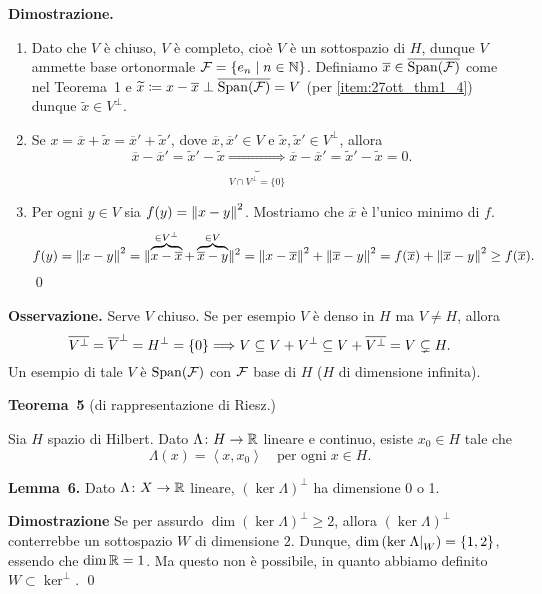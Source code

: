 \textbf{Dimostrazione.}
\begin{enumerate}

\item Dato che $V$ è chiuso, $V$ è completo, cioè $V$ è un sottospazio di $H$, dunque $V$ ammette base ortonormale $\mathcal{F} = \left\{ e_n \;\middle|\; n \in \mathbb N \right\}$.
Definiamo $\overline{x} \in \overline{\operatorname{Span}(\mathcal{F})}$ come nel Teorema~1 e $\widetilde{x} \coloneqq x - \overline{x} \perp \overline{\operatorname{Span}(\mathcal{F})} = V$ (per \ref{item:27ott_thm1_4}) dunque $\tilde{x} \in V^\perp$.

\item Se $x = \overline{x} + \tilde{x} = \overline{x}' + \tilde{x}'$, dove $\overline{x}, \overline{x}' \in V$ e $\tilde{x}, \tilde{x}' \in V^\perp$, allora
%
$$
	\overline{x} - \overline{x}' = \tilde{x}' - \tilde{x} \underbrace{\Longrightarrow}_{V \cap V^\perp = \{0 \} }
	\overline{x} - \overline{x}' = \tilde{x}' - \tilde{x} = 0.
$$
%

\item Per ogni $y \in V$ sia $f(y) = \left\lVert x - y \right\rVert^2$. Mostriamo che $\overline{x}$ è l'unico minimo di $f$.
%
$$
f(y) = \left\lVert x - y \right\rVert^2 = \lVert{\overbrace{x - \overline{x}}^{\in V^\perp} + \overbrace{\overline{x} - y}^{\in V}}\rVert^2 = \left\lVert x - \overline{x} \right\rVert^2 + \left\lVert \overline{x} - y \right\rVert^2
= f(\overline{x}) + \left\lVert \overline{x} - y \right\rVert^2 \geq f(\overline{x}).
$$
%
\qed
\end{enumerate}

\vs

\textbf{Osservazione.}
Serve $V$ chiuso. Se per esempio $V$ è denso in $H$ ma $V \neq H$, allora
%
$$
\overline{V^\perp} = \overline{V}^\perp = H^\perp = \{0\} \Longrightarrow V \subseteq V + V^\perp \subseteq V + \overline{V^\perp} = V \subsetneq H.
$$
%
Un esempio di tale $V$ è $\operatorname{Span}(\mathcal{F})$ con $\mathcal{F}$ base di $H$ ($H$ di dimensione infinita).

\newpage

\hypertarget{thm:lez2728ott-teo3}{%
\textbf{Teorema~5} (di rappresentazione di Riesz.)} Sia $H$ spazio di Hilbert. Dato $\Lambda \colon  H \to \mathbb R$ lineare e continuo, esiste $x_0 \in H$ tale che 
\begin{equation} \tag{$\ast$}
	\Lambda(x) = \left<x,x_0 \right> \quad \text{per ogni} \; x \in H.
\end{equation}

\textbf{Lemma~6.} Dato $\Lambda \colon X \to \mathbb R$ lineare, $\left( \ker \Lambda \right)^\perp$ ha dimensione 0 o 1.

\textbf{Dimostrazione} Se per assurdo $\dim (\ker \Lambda)^\perp \geq 2$, allora $(\ker \Lambda)^\perp$ conterrebbe un sottospazio $W$ di dimensione $2$.
Dunque, $\operatorname{dim} \left( \ker \left.\Lambda\right|_{W} \right) = \{1,2\}$, essendo che $\operatorname{dim} \mathbb R = 1$. Ma questo non è possibile, in quanto abbiamo definito $W \subset \ker^\perp$. 
\qed

